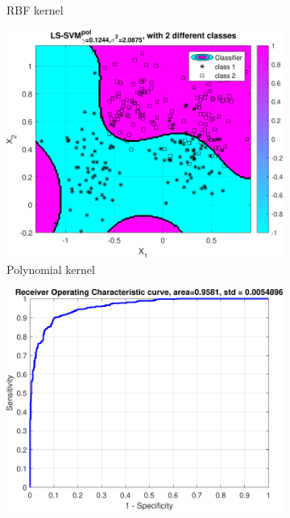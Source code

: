 \documentclass{article}
\begin{document}
\begin{figure}[h]
\begin{subfigure}[b]{0.3\textwidth}
                    \caption{RBF kernel}
                     \label{fig:ripley_rbf_result}
                 \end{subfigure}
                 \hfill
                 \begin{subfigure}[b]{0.3\textwidth}
                     \centering
                     \includegraphics[width=\textwidth]{Assignment 1/figures/ripley_simplex_polynomial_classification_result.pdf}
                    \caption{Polynomial kernel}
                     \label{fig:ripley_poly_result}
                 \end{subfigure}
                 \hfill
                 \begin{subfigure}[b]{0.3\textwidth}
                     \centering
                     \includegraphics[width=\textwidth]{Assignment 1/figures/ripley_simplex_linear_classifier_roc.pdf}

\end{subfigure}
\end{figure}
\end{document}
